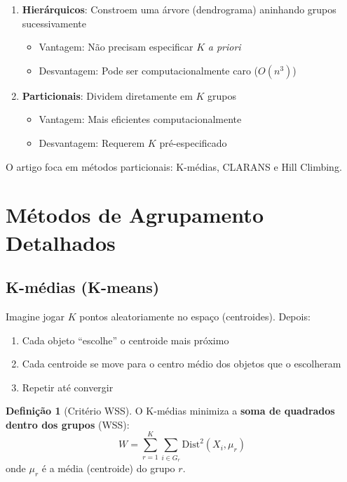 \documentclass[12pt,a4paper]{article}
\theoremstyle{definition}
\newtheorem{definicao}{Definição}[section]
\begin{document}
\begin{enumerate}[leftmargin=*]
    \item \textbf{Hierárquicos}: Constroem uma árvore (dendrograma) aninhando grupos sucessivamente
    \begin{itemize}
        \item Vantagem: Não precisam especificar $K$ \textit{a priori}
        \item Desvantagem: Pode ser computacionalmente caro ($O(n^3)$)
    \end{itemize}
    
    \item \textbf{Particionais}: Dividem diretamente em $K$ grupos
    \begin{itemize}
        \item Vantagem: Mais eficientes computacionalmente
        \item Desvantagem: Requerem $K$ pré-especificado
    \end{itemize}
\end{enumerate}

O artigo foca em métodos particionais: K-médias, CLARANS e Hill Climbing.

\section{Métodos de Agrupamento Detalhados}

\subsection{K-médias (K-means)}

\begin{tcolorbox}[caixaalgoritmo={Intuição do K-médias}]
Imagine jogar $K$ pontos aleatoriamente no espaço (centroides). Depois:
\begin{enumerate}
    \item Cada objeto ``escolhe'' o centroide mais próximo
    \item Cada centroide se move para o centro médio dos objetos que o escolheram
    \item Repetir até convergir
\end{enumerate}
\end{tcolorbox}

\begin{definicao}[Critério WSS]
O K-médias minimiza a \textbf{soma de quadrados dentro dos grupos} (WSS):
\begin{equation}
W = \sum_{r=1}^K \sum_{i \in G_r} \text{Dist}^2(X_i, \mu_r)
\end{equation}
onde $\mu_r$ é a média (centroide) do grupo $r$.
\end{definicao}
\end{document}
